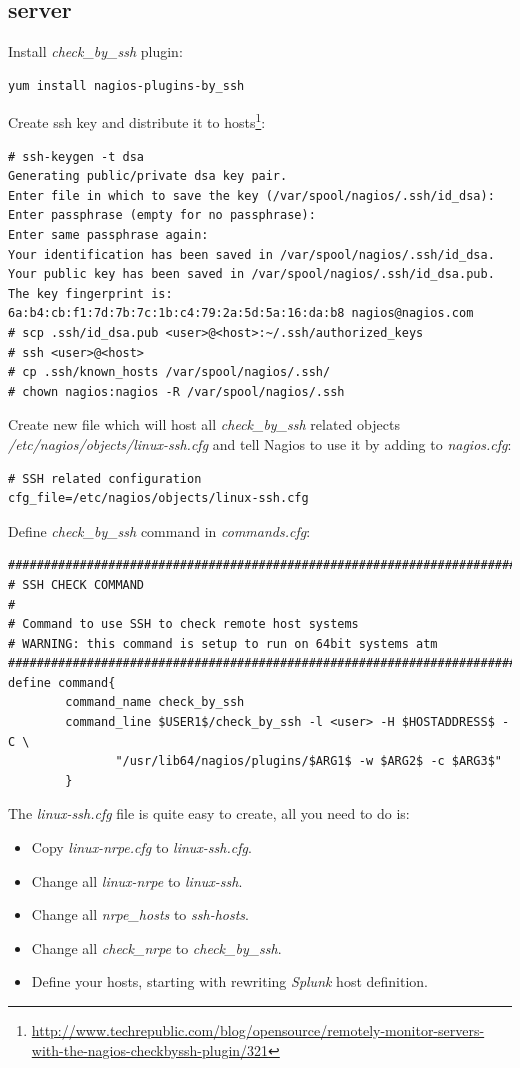 \documentclass[10pt,a4paper,final]{report}
\begin{document}
\subsection{server}
Install \emph{check\_by\_ssh} plugin:
\begin{lstlisting}
yum install nagios-plugins-by_ssh
\end{lstlisting}
Create ssh key and distribute it to hosts\footnote{\url{http://www.techrepublic.com/blog/opensource/remotely-monitor-servers-with-the-nagios-checkbyssh-plugin/321}}:
\begin{lstlisting}
# ssh-keygen -t dsa
Generating public/private dsa key pair.
Enter file in which to save the key (/var/spool/nagios/.ssh/id_dsa):
Enter passphrase (empty for no passphrase):
Enter same passphrase again:
Your identification has been saved in /var/spool/nagios/.ssh/id_dsa.
Your public key has been saved in /var/spool/nagios/.ssh/id_dsa.pub.
The key fingerprint is:
6a:b4:cb:f1:7d:7b:7c:1b:c4:79:2a:5d:5a:16:da:b8 nagios@nagios.com
# scp .ssh/id_dsa.pub <user>@<host>:~/.ssh/authorized_keys
# ssh <user>@<host>
# cp .ssh/known_hosts /var/spool/nagios/.ssh/
# chown nagios:nagios -R /var/spool/nagios/.ssh
\end{lstlisting}
Create new file which will host all \emph{check\_by\_ssh} related objects \emph{/etc/nagios/objects/linux-ssh.cfg} and tell Nagios to use it by adding to \emph{nagios.cfg}:
\begin{lstlisting}
# SSH related configuration
cfg_file=/etc/nagios/objects/linux-ssh.cfg
\end{lstlisting}
Define \emph{check\_by\_ssh} command in \emph{commands.cfg}:
\begin{lstlisting}
###############################################################################
# SSH CHECK COMMAND
#
# Command to use SSH to check remote host systems
# WARNING: this command is setup to run on 64bit systems atm
###############################################################################
define command{
        command_name check_by_ssh
        command_line $USER1$/check_by_ssh -l <user> -H $HOSTADDRESS$ -C \
	           "/usr/lib64/nagios/plugins/$ARG1$ -w $ARG2$ -c $ARG3$"
        }
\end{lstlisting}
The \emph{linux-ssh.cfg} file is quite easy to create, all you need to do is:
\begin{itemize}
\item Copy \emph{linux-nrpe.cfg} to \emph{linux-ssh.cfg}.
\item Change all \emph{linux-nrpe} to \emph{linux-ssh}.
\item Change all \emph{nrpe\_hosts} to \emph{ssh-hosts}.
\item Change all \emph{check\_nrpe} to \emph{check\_by\_ssh}.
\item Define your hosts, starting with rewriting \emph{Splunk} host definition.
\end{itemize}
\end{document}
